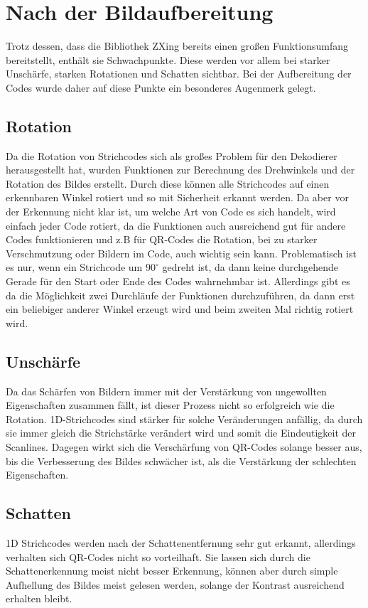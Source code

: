 \section{Nach der Bildaufbereitung}
\writtenby{\dcauthornameriren}%
Trotz dessen, dass die Bibliothek ZXing bereits einen großen Funktionsumfang bereitstellt, enthält sie Schwachpunkte. Diese werden vor allem bei starker Unschärfe, starken Rotationen und Schatten sichtbar.
Bei der Aufbereitung der Codes wurde daher auf diese Punkte ein besonderes Augenmerk gelegt.


\subsection*{Rotation}
Da die Rotation von Strichcodes sich als großes Problem für den Dekodierer herausgestellt hat, wurden Funktionen zur Berechnung des Drehwinkels und der Rotation des Bildes erstellt. Durch diese können alle Strichcodes auf einen erkennbaren Winkel rotiert und so mit Sicherheit erkannt werden.
Da aber vor der Erkennung nicht klar ist, um welche Art von Code es sich handelt, wird einfach jeder Code rotiert, da die Funktionen auch ausreichend gut für andere Codes funktionieren und z.B für QR-Codes die Rotation, bei zu starker Verschmutzung oder Bildern im Code, auch wichtig sein kann.
Problematisch ist es nur, wenn ein Strichcode um $90^\circ$ gedreht ist, da dann keine durchgehende Gerade für den Start oder Ende des Codes wahrnehmbar ist. Allerdings gibt es da die Möglichkeit zwei Durchläufe der Funktionen durchzuführen, da dann erst ein beliebiger anderer Winkel erzeugt wird und beim zweiten Mal richtig rotiert wird.


\subsection*{Unschärfe}
Da das Schärfen von Bildern immer mit der Verstärkung von ungewollten Eigenschaften zusammen fällt, ist dieser Prozess nicht so erfolgreich wie die Rotation. 1D-Strichcodes sind stärker für solche Veränderungen anfällig, da durch sie immer gleich die Strichstärke verändert wird und somit die Eindeutigkeit der Scanlines. Dagegen wirkt sich die Verschärfung von QR-Codes solange besser aus, bis die Verbesserung des Bildes schwächer ist, als die Verstärkung der schlechten Eigenschaften. 


\subsection*{Schatten}
1D Strichcodes werden nach der Schattenentfernung sehr gut erkannt, allerdings verhalten sich QR-Codes nicht so vorteilhaft. Sie lassen sich durch die Schattenerkennung meist nicht besser Erkennung, können aber durch simple Aufhellung des Bildes meist gelesen werden, solange der Kontrast ausreichend erhalten bleibt.


